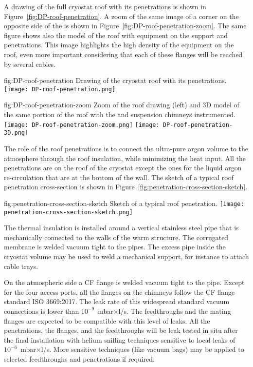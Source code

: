 A drawing of the full cryostat roof with its penetrations is shown in Figure~\ref{fig:DP-roof-penetration}.
A zoom of the same image of a corner on the opposite side of the  is shown in Figure~\ref{fig:DP-roof-penetration-zoom}.
The same figure shows also the \threed model of the roof with equipment on the  support and  penetrations.
This image highlights the high density of the equipment on the  roof, even more important considering that each of these flanges will be reached by several cables.

\begin{dunefigure}{fig:DP-roof-penetration}
{Drawing of the cryostat roof with its penetrations.}
\texttt{[image: DP-roof-penetration.png]}
\end{dunefigure}

\begin{dunefigure}{fig:DP-roof-penetration-zoom}
{Zoom of the  roof drawing (left) and 3D model of the same portion of the roof with the  and  suspension chimneys instrumented.}
\texttt{[image: DP-roof-penetration-zoom.png]}
\texttt{[image: DP-roof-penetration-3D.png]}
\end{dunefigure}

The role of the roof penetrations is to connect the ultra-pure argon volume to the atmosphere through the roof insulation, while minimizing the heat input.
All the penetrations are on the roof of the cryostat except the ones for the liquid argon re-circulation that are at the bottom of the  wall.
The sketch of a typical roof penetration cross-section is shown in Figure~\ref{fig:penetration-cross-section-sketch}.
\begin{dunefigure}{fig:penetration-cross-section-sketch}
{Sketch of a typical roof penetration.}
\texttt{[image: penetration-cross-section-sketch.png]}
\end{dunefigure}
The thermal insulation is installed around a vertical stainless steel pipe that is mechanically connected to the walls of the warm structure.
The corrugated membrane is welded vacuum tight to the pipes.
The excess pipe inside the cryostat volume may be used to weld a mechanical support, for instance to attach cable trays.

On the atmospheric side a  CF flange is welded vacuum tight to the pipe.
Except for the four access ports, all the flanges on the chimneys follow the  CF flange standard ISO 3669:2017.
The leak rate of this widespread standard vacuum connections is lower than $10^{-9}$~mbar$\times$l/s.
The feedthroughs and the mating flanges are expected to be compatible with this level of leaks.
All the penetrations, the flanges, and the feedthroughs will be leak tested in situ after the final installation with helium sniffing techniques sensitive to local leaks of $10^{-6}$~mbar$\times$l/s.
More sensitive techniques (like vacuum bags) may be applied to selected feedthroughs and penetrations if required.

